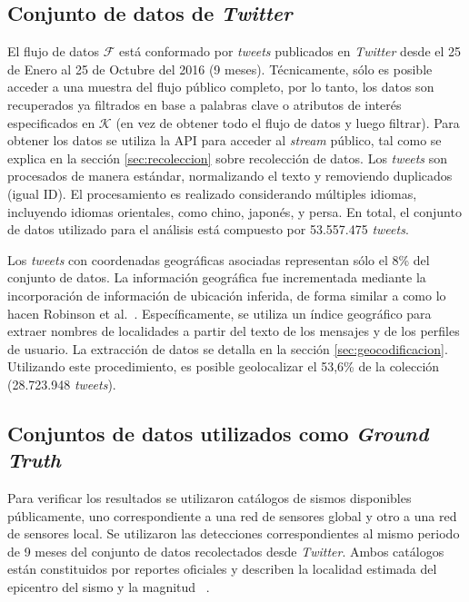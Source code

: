 	\subsection{Conjunto de datos de \textit{Twitter}}
	
		El flujo de datos $\mathcal{F}$ está conformado por \textit{tweets} publicados en \textit{Twitter} desde el 25 de Enero al 25 de Octubre del 2016 (9 meses). Técnicamente, sólo es posible acceder a una muestra del flujo público completo, por lo tanto, los datos son recuperados ya filtrados en base a palabras clave o atributos de interés especificados en $\mathcal{K}$ (en vez de obtener todo el flujo de datos y luego filtrar).  Para obtener los datos se utiliza la API para acceder al \textit{stream} público, tal como se explica en la sección \ref{sec:recoleccion} sobre recolección de datos. Los \textit{tweets} son procesados de manera estándar, normalizando el texto y removiendo duplicados (igual ID). El procesamiento es realizado considerando múltiples idiomas, incluyendo idiomas orientales, como chino, japonés, y persa. En total, el conjunto de datos utilizado para el análisis está compuesto por 53.557.475 \textit{tweets}.
		
		Los \textit{tweets} con coordenadas geográficas asociadas representan sólo el 8\% del conjunto de datos. La información geográfica fue incrementada mediante la incorporación de información de ubicación inferida, de forma similar a como lo hacen Robinson et al.~\cite{robinson2013sensitive}. Específicamente, se utiliza un índice geográfico para extraer nombres de localidades a partir del texto de los mensajes y de los perfiles de usuario. La extracción de datos se detalla en la sección \ref{sec:geocodificacion}. Utilizando este procedimiento, es posible geolocalizar el 53,6\% de la colección (28.723.948 \textit{tweets}).
		
	\subsection{Conjuntos de datos utilizados como \textit{Ground Truth}}
	
		Para verificar los resultados se utilizaron catálogos de sismos disponibles públicamente, uno correspondiente a una red de sensores global y otro a una red de sensores local. Se utilizaron las detecciones correspondientes al mismo periodo de 9 meses del conjunto de datos recolectados desde \textit{Twitter}. Ambos catálogos están constituidos por reportes oficiales y describen la localidad estimada del epicentro del sismo y la magnitud ~\cite{usgs:magnitude}.
		
